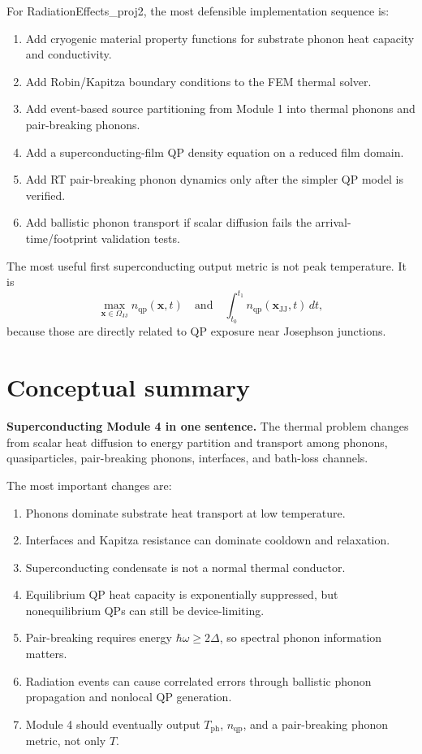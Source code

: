\documentclass[11pt]{article}
\newcommand{\nqp}{n_{\mathrm{qp}}}
\newcommand{\x}{\mathbf{x}}
\begin{document}
For RadiationEffects\_proj2, the most defensible implementation sequence is:
\begin{enumerate}[label=\arabic*.]
\item Add cryogenic material property functions for substrate phonon heat capacity and conductivity.
\item Add Robin/Kapitza boundary conditions to the FEM thermal solver.
\item Add event-based source partitioning from Module 1 into thermal phonons and pair-breaking phonons.
\item Add a superconducting-film QP density equation on a reduced film domain.
\item Add RT pair-breaking phonon dynamics only after the simpler QP model is verified.
\item Add ballistic phonon transport if scalar diffusion fails the arrival-time/footprint validation tests.
\end{enumerate}

The most useful first superconducting output metric is not peak temperature. It is
\begin{equation}
\max_{\x\in\Omega_{\mathrm{JJ}}}\nqp(\x,t)
\quad \text{and} \quad
\int_{t_0}^{t_1}\nqp(\x_{\mathrm{JJ}},t)\,dt,
\end{equation}
because those are directly related to QP exposure near Josephson junctions.

\section{Conceptual summary}

\begin{physicsbox}
\textbf{Superconducting Module 4 in one sentence.} The thermal problem changes from scalar heat diffusion to energy partition and transport among phonons, quasiparticles, pair-breaking phonons, interfaces, and bath-loss channels.
\end{physicsbox}

The most important changes are:
\begin{enumerate}[label=\arabic*.]
\item Phonons dominate substrate heat transport at low temperature.
\item Interfaces and Kapitza resistance can dominate cooldown and relaxation.
\item Superconducting condensate is not a normal thermal conductor.
\item Equilibrium QP heat capacity is exponentially suppressed, but nonequilibrium QPs can still be device-limiting.
\item Pair-breaking requires energy \(\hbar\omega\ge2\Delta\), so spectral phonon information matters.
\item Radiation events can cause correlated errors through ballistic phonon propagation and nonlocal QP generation.
\item Module 4 should eventually output \(T_{\mathrm{ph}}\), \(\nqp\), and a pair-breaking phonon metric, not only \(T\).
\end{enumerate}
\end{document}
